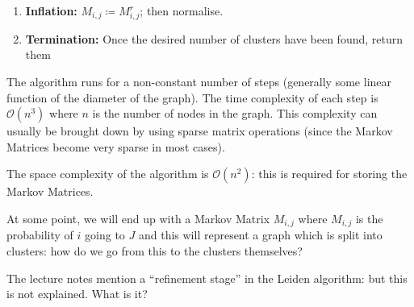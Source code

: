 \documentclass[10pt,\jkfside,a4paper]{article}
\begin{document}
\begin{enumerate}
\begin{enumerate}
        \item \textbf{Inflation:} $M_{i, j} \coloneqq M^r_{i, j}$; then normalise.

        \item \textbf{Termination:} Once the desired number of clusters have been found, return them

    \end{enumerate}

    The algorithm runs for a non-constant number of steps (generally some linear function of the diameter of the graph). The time complexity of each step is $\mathcal O(n^3)$ where $n$ is the number of nodes in
    the graph. This complexity can usually be brought down by using sparse matrix operations (since the Markov Matrices become very sparse in most cases).

    The space complexity of the algorithm is $\mathcal O(n^2)$: this is required for storing the Markov Matrices.

    \begin{question}

        At some point, we will end up with a Markov Matrix $M_{i, j}$ where $M_{i, j}$ is the probability of $i$ going to $J$ and this will represent a graph which is split into clusters: how do we go from this
        to the clusters themselves?

    \end{question}


\end{enumerate}

\begin{question}

    The lecture notes mention a ``refinement stage'' in the Leiden algorithm: but this is not explained. What is it?

\end{question}

\end{document}
